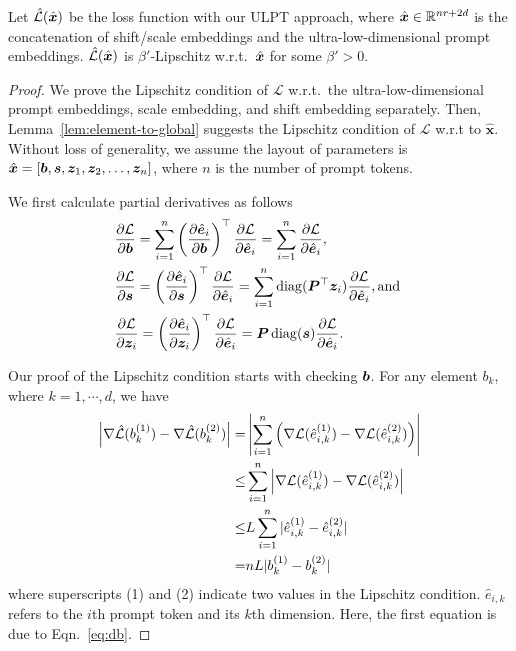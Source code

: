 \begin{lemma}\label{lem:lip}
    Let $\hat{{\mathcal{L}}}(\hat {{\bm{x}}})$ be the loss function with our ULPT approach, where $\hat{{\bm{x}}}\in\mathbb R^{nr+2d}$ is the concatenation of shift/scale embeddings and the ultra-low-dimensional prompt embeddings.  $\hat{{\mathcal{L}}}(\hat {{\bm{x}}})$ is $\beta'$-Lipschitz w.r.t.~$\hat{{\bm{x}}}$ for some $\beta'>0$. 
\end{lemma}
\begin{proof} We prove the Lipschitz condition of $\mathcal L$ w.r.t.~the ultra-low-dimensional prompt embeddings, scale embedding, and shift embedding separately. Then, Lemma~\ref{lem:element-to-global} suggests the Lipschitz condition of $\mathcal L$ w.r.t to $\hat {\bm x}$. Without loss of generality, we assume the layout of parameters is $\hat {\bm x}=[{\bm{b}}, {\bm{s}}, {\bm{z}}_1, {\bm{z}}_2, \dots, {\bm{z}}_n]$, where $n$ is the number of prompt tokens. 

We first calculate partial derivatives as follows \begin{align}
       & \frac{\partial {\mathcal{L}}}{\partial {\bm{b}}}
        = \sum_{i=1}^n\left(\frac{\partial \hat{{\bm{e}}}_i}{\partial {\bm{b}}}\right)^\top \frac{\partial {\mathcal{L}}}{\partial \hat {{\bm{e}}}_i}  = \sum_{i=1}^n \frac{\partial {\mathcal{L}}}{\partial \hat{{\bm{e}}}_i}, \label{eq:db}\\
        & \frac{\partial {\mathcal{L}}}{\partial {\bm{s}}} = \left(\frac{\partial \hat{{\bm{e}}}_i}{\partial {\bm{s}}}\right)^\top \frac{\partial {\mathcal{L}}}{\partial \hat {{\bm{e}}}_i}  = \sum_{i=1}^n \operatorname{diag}( {\bm{P}}^\top {\bm{z}}_i)  \frac{\partial {\mathcal{L}}}{\partial \hat{{\bm{e}}}_i},  \text{and } \label{eq:ds}\\
        & \frac{\partial {\mathcal{L}}}{\partial {\bm{z}}_i}        = \left(\frac{\partial \hat{{\bm{e}}}_i}{\partial {\bm{z}}_i}\right)^\top \frac{\partial {\mathcal{L}}}{\partial \hat {{\bm{e}}}_i}  = {\bm{P}} \operatorname{diag}({\bm{s}}) \frac{\partial {\mathcal{L}}}{\partial \hat{{\bm{e}}}_i}. \label{eq:dqi}
    \end{align}

 Our proof of the Lipschitz condition starts with checking ${\bm{b}}$. For any element $b_k$, where $k=1,\cdots, d$, we have \begin{align}
        \left|\nabla \hat{{\mathcal{L}}}(b_k^{(1)}) - \nabla \hat{{\mathcal{L}}}(b_k^{(2)} )  \right| =&  
        \left| \sum_{i=1}^n \left( \nabla {\mathcal{L}}(\hat e_{i,k}^{(1)}) - \nabla {\mathcal{L}}(\hat e_{i,k}^{(2)}) \right) \right| \\
        \le&  \sum_{i=1}^n \left|  \nabla {\mathcal{L}}(\hat e_{i,k}^{(1)}) - \nabla {\mathcal{L}}(\hat e_{i,k}^{(2)}) \right| \\
        \le&  L \sum_{i=1}^n |\hat e_{i,k}^{(1)} - \hat e_{i,k}^{(2)}| \\
        =& nL | b_k^{(1)} - b_k^{(2)} |
    \end{align}
    where superscripts (1) and (2) indicate two values in the Lipschitz condition. $\hat e_{i,k}$ refers to the $i$th prompt token and its $k$th dimension. Here, the first equation is due to Eqn.~\eqref{eq:db}.


\end{proof}

